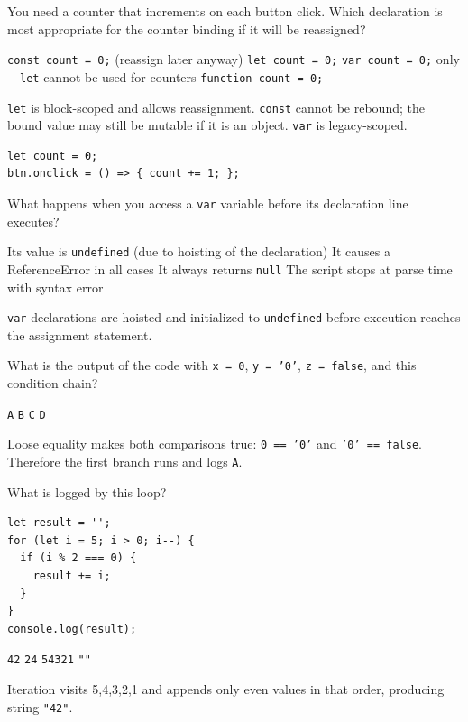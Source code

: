 \newpage
{}

\question[4]
You need a counter that increments on each button click. Which declaration is most appropriate for the counter binding if it will be reassigned?
\begin{choices}
  \choice \texttt{const count = 0;} (reassign later anyway)
  \CorrectChoice \texttt{let count = 0;}
  \choice \texttt{var count = 0;} only---\texttt{let} cannot be used for counters
  \choice \texttt{function count = 0;}
\end{choices}
\begin{solution}
  \texttt{let} is block-scoped and allows reassignment. \texttt{const} cannot be rebound; the bound value may still be mutable if it is an object. \texttt{var} is legacy-scoped.
\begin{lstlisting}[style=jsexam]
let count = 0;
btn.onclick = () => { count += 1; };
\end{lstlisting}
\end{solution}

\question[4]
What happens when you access a \texttt{var} variable before its declaration line executes?
\begin{choices}
  \CorrectChoice Its value is \texttt{undefined} (due to hoisting of the declaration)
  \choice It causes a ReferenceError in all cases
  \choice It always returns \texttt{null}
  \choice The script stops at parse time with syntax error
\end{choices}
\begin{solution}
  \texttt{var} declarations are hoisted and initialized to \texttt{undefined} before execution reaches the assignment statement.
\end{solution}

\question[4]
What is the output of the code with \texttt{x = 0}, \texttt{y = '0'}, \texttt{z = false}, and this condition chain?
\begin{choices}
  \CorrectChoice \texttt{A}
  \choice \texttt{B}
  \choice \texttt{C}
  \choice \texttt{D}
\end{choices}
\begin{solution}
  Loose equality makes both comparisons true: \texttt{0 == '0'} and \texttt{'0' == false}. Therefore the first branch runs and logs \texttt{A}.
\end{solution}

\question[4]
What is logged by this loop?
\begin{lstlisting}[style=jsexam]
let result = '';
for (let i = 5; i > 0; i--) {
  if (i % 2 === 0) {
    result += i;
  }
}
console.log(result);
\end{lstlisting}
\begin{choices}
  \CorrectChoice \texttt{42}
  \choice \texttt{24}
  \choice \texttt{54321}
  \choice \texttt{""}
\end{choices}
\begin{solution}
  Iteration visits 5,4,3,2,1 and appends only even values in that order, producing string \texttt{"42"}.
\end{solution}

